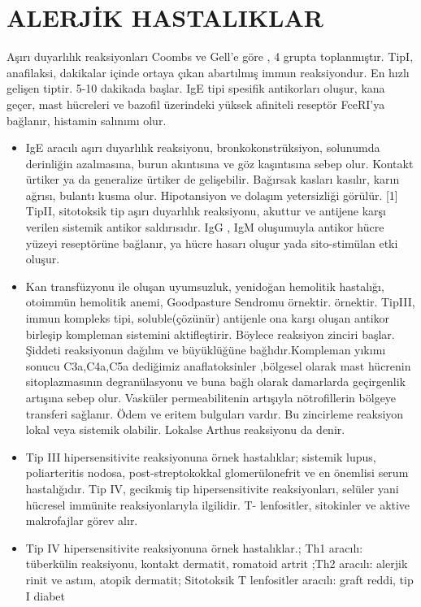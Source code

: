 \chapter{ALERJİK HASTALIKLAR}
Aşırı duyarlılık reaksiyonları Coombs ve Gell’e göre , 4 grupta toplanmıştır.
  TipI, anafilaksi, dakikalar içinde ortaya çıkan abartılmış immun reaksiyondur. En hızlı gelişen tiptir. 5-10 dakikada başlar. IgE tipi spesifik antikorları oluşur,  kana geçer,  mast hücreleri ve bazofil üzerindeki yüksek afiniteli reseptör FceRI’ya bağlanır, histamin salınımı olur. 
\begin{itemize}
   \item IgE aracılı aşırı duyarlılık reaksiyonu, bronkokonstrüksiyon, solunumda derinliğin azalmasına, burun akıntısına ve göz kaşıntısına sebep olur. Kontakt ürtiker ya da generalize ürtiker de gelişebilir. Bağırsak kasları kasılır, karın ağrısı, bulantı kusma olur. Hipotansiyon ve dolaşım yetersizliği görülür. [1]
  TipII,  sitotoksik tip aşırı duyarlılık reaksiyonu, akuttur ve antijene karşı verilen sistemik antikor saldırısıdır.  IgG , IgM  oluşumuyla antikor hücre yüzeyi reseptörüne bağlanır, ya hücre hasarı oluşur yada sito-stimülan etki oluşur.
   \item Kan transfüzyonu ile oluşan uyumsuzluk, yenidoğan hemolitik hastalığı, otoimmün hemolitik anemi, Goodpasture Sendromu örnektir.
örnektir.
  TipIII, immun kompleks tipi, soluble(çözünür) antijenle ona karşı oluşan antikor birleşip kompleman sistemini aktifleştirir. Böylece reaksiyon zinciri başlar. Şiddeti reaksiyonun dağılım ve büyüklüğüne bağlıdır.Kompleman yıkımı sonucu  C3a,C4a,C5a dediğimiz anaflatoksinler ,bölgesel olarak mast hücrenin sitoplazmasının degranülasyonu ve buna bağlı olarak damarlarda geçirgenlik artışına sebep olur. Vasküler permeabilitenin artışıyla nötrofillerin bölgeye transferi sağlanır. Ödem ve eritem bulguları vardır. Bu zincirleme reaksiyon lokal veya sistemik olabilir.  Lokalse Arthus reaksiyonu da denir.
   \item Tip III hipersensitivite reaksiyonuna örnek hastalıklar;
sistemik lupus, poliarteritis nodosa, post-streptokokkal glomerülonefrit ve en önemlisi serum hastalığıdır.
  Tip IV, gecikmiş tip hipersensitivite reaksiyonları, selüler yani hücresel immünite reaksiyonlarıyla ilgilidir. T- lenfositler, sitokinler ve aktive makrofajlar görev alır.
  \item Tip IV hipersensitivite reaksiyonuna örnek hastalıklar.;
Th1 aracılı: tüberkülin reaksiyonu, kontakt dermatit, romatoid artrit
;Th2 aracılı: alerjik rinit ve astım, atopik dermatit; Sitotoksik T lenfositler aracılı: graft reddi, tip I diabet
\end{itemize} 

